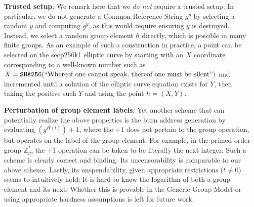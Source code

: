 \noindent
\textbf{Trusted setup.}
We remark here that we \emph{do not} require a trusted setup. In particular, we do not generate a Common Reference String $g^y$ by selecting a random $y$ and computing $g^y$, as this would require ensuring $y$ is destroyed. Instead, we select a random group element $h$ directly, which is possible in many finite groups. As an example of such a construction in practice, a point can be selected on the secp256k1 elliptic curve by starting with an $X$ coordinate corresponding to a well-known number such as $X = \texttt{SHA256}(\text{``Whereof one cannot speak, thereof one must be silent''})$ and incremented until a solution of the elliptic curve equation exists for $Y$, then taking the positive such $Y$ and using the point $h = (X, Y)$.

\noindent
\textbf{Perturbation of group element labels.}
Yet another scheme that can potentially realize the above properties is the burn
address generation by evaluating $(g^{H(t)}) + 1$, where the $+1$ does not pertain to
the group operation, but operates on the label of the group element. For
example, in the primed order group $\mathbb{Z}_p^*$, the $+1$ operation can be taken to be literally
the next integer. Such a scheme is clearly correct and binding. Its
uncensorability is comparable to our above scheme. Lastly, its unspendability,
given appropriate restrictions ($t \neq 0$) seems to intuitively hold: It is
hard to know the logarithm of both a group element and its next. Whether this is
provable in the Generic Group Model or using appropriate hardness assumptions is
left for future work.
